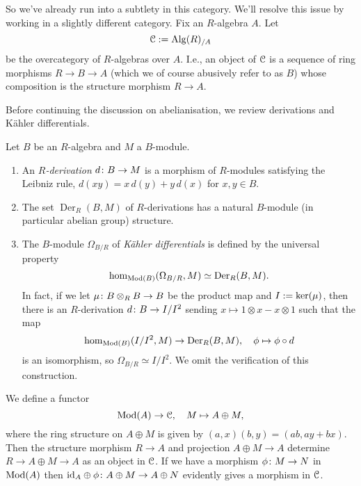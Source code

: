 \begin{nothing}
  So we've already run into a subtlety in this category. We'll resolve
  this issue by working in a slightly different category. Fix an
  $R$-algebra $A$. Let
  \[
  \mathcal{C} \mathrel{:=} \mathrm{Alg}(R)_{/A}
  \]
  be the overcategory of $R$-algebras over $A$. I.e., an object of
  $\mathcal{C}$ is a sequence of ring morphisms $R \to B \to A$ (which we of
  course abusively refer to as $B$) whose composition is the structure
  morphism $R \to A$.
\end{nothing}

Before continuing the discussion on abelianisation, we review
derivations and K\"ahler differentials.

\newcommand{\Der}{\operatorname{Der}}

\begin{definitions}
  \label{derivations}
  Let $B$ be an $R$-algebra and $M$ a $B$-module.
  \begin{enumerate}[leftmargin=*]
  \item An \emph{$R$-derivation} $d \colon B \to M$ is a morphism of
    $R$-modules satisfying the Leibniz rule, $d(xy) = x\,d(y) +
    y\,d(x)$ for $x,y \in B$.
  \item The set $\Der_R(B,M)$ of $R$-derivations has a natural
    $B$-module (in particular abelian group) structure.
  \item \label{kahdiff} The $B$-module $\Omega_{B/R}$ of
    \emph{K\"ahler differentials} is defined by the universal property
    \[
    \hom_{\Mod(B)}(\Omega_{B/R}, M) \simeq \Der_R(B,M).
    \]
    In fact, if we let $\mu \colon B \otimes_R B \to B$ be the product map
    and $I \mathrel{:=} \operatorname{ker}(\mu)$, then there is an $R$-derivation $d \colon
    B \to I/I^2$ sending $x \mapsto 1 \otimes x - x \otimes 1$ such
    that the map
    \[
    \hom_{\Mod(B)}(I/I^2, M) \to \Der_R(B,M), \quad \phi \mapsto \phi
    \circ d
    \]
    is an isomorphism, so $\Omega_{B/R} \simeq I/I^2$. We omit the
    verification of this construction.
  \end{enumerate}
\end{definitions}

\begin{nothing}
  \label{square-zero}
  We define a functor
  \[
  \mathrm{Mod}(A) \to \mathcal{C}, \quad M \mapsto A \oplus M,
  \]
  where the ring structure on $A \oplus M$ is given by $(a,x)(b,y) =
  (ab,ay+bx)$. Then the structure morphism $R \to A$ and projection $A
  \oplus M \to A$ determine $R \to A \oplus M \to A$ as an object in
  $\mathcal{C}$. If we have a morphism $\phi \colon M \to N$ in $\mathrm{Mod}(A)$ then
  $\mathrm{id}_A \oplus \phi \colon A \oplus M \to A \oplus N$ evidently gives a
  morphism in $\mathcal{C}$.
\end{nothing}

